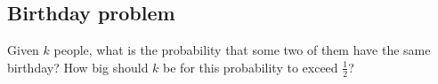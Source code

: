 \subsection{Birthday problem}
Given $k$ people, what is the probability that some two of them have the same birthday?
How big should $k$ be for this probability to exceed $\frac12$?









